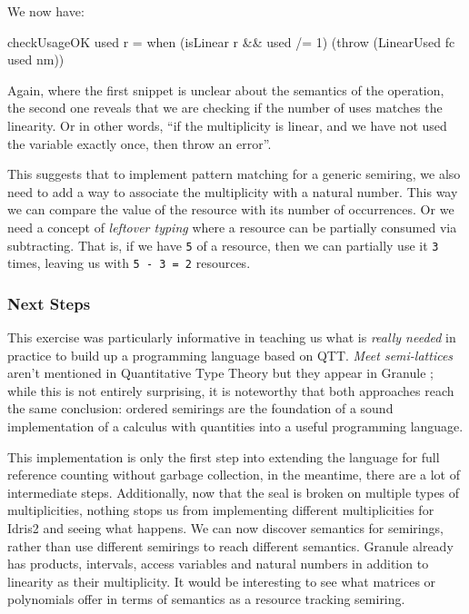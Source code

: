 \documentclass[
]{article}
\newenvironment{Shaded}{}{}
\newcommand{\DataTypeTok}[1]{\textcolor[rgb]{0.56,0.13,0.00}{#1}}
\newcommand{\DecValTok}[1]{\textcolor[rgb]{0.25,0.63,0.44}{#1}}
\newcommand{\NormalTok}[1]{#1}
\newcommand{\OperatorTok}[1]{\textcolor[rgb]{0.40,0.40,0.40}{#1}}
\newcommand{\OtherTok}[1]{\textcolor[rgb]{0.00,0.44,0.13}{#1}}
\begin{document}
We now have:

\begin{Shaded}
\begin{Highlighting}[]
\NormalTok{checkUsageOK used r }\OtherTok{=}\NormalTok{ when (isLinear r }\OperatorTok{\&\&}\NormalTok{ used }\OperatorTok{/=} \DecValTok{1}\NormalTok{)}
\NormalTok{                           (throw (}\DataTypeTok{LinearUsed}\NormalTok{ fc used nm))}
\end{Highlighting}
\end{Shaded}

Again, where the first snippet is unclear about the semantics of the
operation, the second one reveals that we are checking if the number of
uses matches the linearity. Or in other words, ``if the multiplicity is
linear, and we have not used the variable exactly once, then throw an
error''.

This suggests that to implement pattern matching for a generic semiring,
we also need to add a way to associate the multiplicity with a natural
number. This way we can compare the value of the resource with its
number of occurrences. Or we need a concept of \emph{leftover typing}
where a resource can be partially consumed via subtracting. That is, if
we have \texttt{5} of a resource, then we can partially use it
\texttt{3} times, leaving us with \texttt{5\ -\ 3\ =\ 2} resources.

\hypertarget{next-steps}{%
\subsubsection{Next Steps}\label{next-steps}}

This exercise was particularly informative in teaching us what is
\emph{really needed} in practice to build up a programming language
based on QTT. \emph{Meet semi-lattices} aren't mentioned in Quantitative
Type Theory\cite{qtt} but they appear in Granule \cite{granule}; while
this is not entirely surprising, it is noteworthy that both approaches
reach the same conclusion: ordered semirings are the foundation of a
sound implementation of a calculus with quantities into a useful
programming language.

This implementation is only the first step into extending the language
for full reference counting without garbage collection, in the meantime,
there are a lot of intermediate steps. Additionally, now that the seal
is broken on multiple types of multiplicities, nothing stops us from
implementing different multiplicities for Idris2 and seeing what
happens. We can now discover semantics for semirings, rather than use
different semirings to reach different semantics. Granule already has
products, intervals, access variables and natural numbers in addition to
linearity as their multiplicity. It would be interesting to see what
matrices or polynomials offer in terms of semantics as a resource
tracking semiring.
\end{document}
